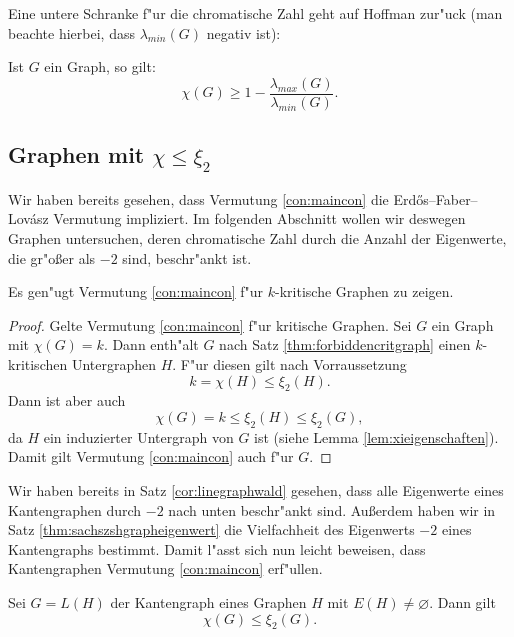 Eine untere Schranke f"ur die chromatische Zahl geht auf Hoffman \cite{Hoffman70} zur"uck (man beachte hierbei, dass $\lambda_{min}(G)$ negativ ist):
\begin{theorem}
  Ist $G$ ein Graph, so gilt:
  $$\chi(G) \geq 1 - \frac{\lambda_{max}(G)}{\lambda_{min}(G)}.$$
  \label{thm:Hoffmanev}
\end{theorem}

\subsection{Graphen mit $\chi \leq \xi_{2}$}

Wir haben bereits gesehen, dass Vermutung \ref{con:maincon} die Erd\H{o}s--Faber--Lov\'asz Vermutung impliziert. Im folgenden Abschnitt wollen wir deswegen Graphen untersuchen, deren chromatische Zahl durch die Anzahl der Eigenwerte, die gr"o{\ss}er als $-2$ sind, beschr"ankt ist.
\begin{remark}
  Es gen"ugt Vermutung \ref{con:maincon} f"ur $k$-kritische Graphen zu zeigen. 
\end{remark}

\begin{proof}
  Gelte Vermutung \ref{con:maincon} f"ur kritische Graphen.
  Sei $G$ ein Graph mit $\chi(G) = k$. Dann enth"alt $G$ nach Satz \ref{thm:forbiddencritgraph} einen $k$-kritischen Untergraphen $H$. F"ur diesen gilt nach Vorraussetzung $$k= \chi(H) \leq \xi_{2}(H).$$ Dann ist aber auch $$ \chi(G) = k \leq \xi_{2}(H) \leq \xi_{2}(G) ,$$ da $H$ ein induzierter Untergraph von $G$ ist (siehe Lemma \ref{lem:xieigenschaften}).  Damit gilt Vermutung \ref{con:maincon} auch f"ur $G$.
\end{proof}

Wir haben bereits in Satz \ref{cor:linegraphwald} gesehen, dass alle Eigenwerte eines Kantengraphen durch $-2$ nach unten beschr"ankt sind. Au{\ss}erdem haben wir in Satz \ref{thm:sachszshgrapheigenwert} die Vielfachheit des Eigenwerts $-2$ eines Kantengraphs bestimmt. Damit l"asst sich nun leicht beweisen, dass Kantengraphen Vermutung \ref{con:maincon} erf"ullen. 
\begin{theorem}
  Sei $G=L(H)$ der Kantengraph eines Graphen $H$ mit $E(H)\neq \varnothing$. Dann gilt $$\chi(G) \leq \xi_2(G).$$
  \label{thm:linegraphconjecture}
\end{theorem}

